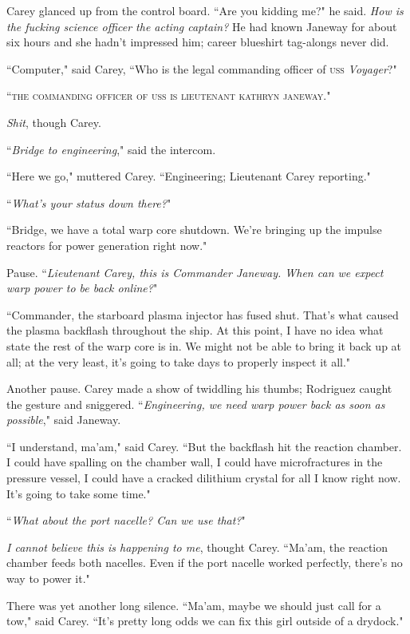 \documentclass[twoside,letterpaper,12pt]{memoir}
\begin{document}
Carey glanced up from the control board. ``Are you kidding me?" he said. \textit{How is the fucking science officer the acting captain?} He had known Janeway for about six hours and she hadn't impressed him; career blueshirt tag-alongs never did.

``Computer," said Carey, ``Who is the legal commanding officer of \textsc{uss} \textit{Voyager}?"

``\textsc{the commanding officer of uss}  \textsc{is lieutenant kathryn janeway}."

\textit{Shit}, though Carey.

``\textit{Bridge to engineering}," said the intercom.

``Here we go," muttered Carey. ``Engineering; Lieutenant Carey reporting."

``\textit{What's your status down there?}"

``Bridge, we have a total warp core shutdown. We're bringing up the impulse reactors for power generation right now."

Pause. ``\textit{Lieutenant Carey, this is Commander Janeway. When can we expect warp power to be back online?}"

``Commander, the starboard plasma injector has fused shut. That's what caused the plasma backflash throughout the ship. At this point, I have no idea what state the rest of the warp core is in. We might not be able to bring it back up at all; at the very least, it's going to take days to properly inspect it all."

Another pause. Carey made a show of twiddling his thumbs; Rodriguez caught the gesture and sniggered. ``\textit{Engineering, we need warp power back as soon as possible}," said Janeway.

``I understand, ma'am," said Carey. ``But the backflash hit the reaction chamber. I could have spalling on the chamber wall, I could have microfractures in the pressure vessel, I could have a cracked dilithium crystal for all I know right now. It's going to take some time."

``\textit{What about the port nacelle? Can we use that?}"

\textit{I cannot believe this is happening to me}, thought Carey. ``Ma'am, the reaction chamber feeds both nacelles. Even if the port nacelle worked perfectly, there's no way to power it."

There was yet another long silence. ``Ma'am, maybe we should just call for a tow," said Carey. ``It's pretty long odds we can fix this girl outside of a drydock."
\end{document}
